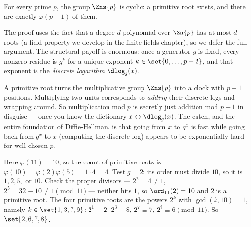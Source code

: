 \begin{theorem}
\label{ch04:thm-primroot-prime}
For every prime $p$, the group $\Zns{p}$ is cyclic: a primitive root exists, and there are exactly
$\varphi(p-1)$ of them.
\end{theorem}

The proof uses the fact that a degree-$d$ polynomial over $\Zn{p}$ has at most $d$ roots (a field
property we develop in the finite-fields chapter), so we defer the full argument. The structural
payoff is enormous: once a generator $g$ is fixed, every nonzero residue is $g^k$ for a unique
exponent $k \in \set{0, \dots, p-2}$, and that exponent is the \emph{discrete logarithm}
$\dlog_g(x)$.

\begin{intuitionbox}
A primitive root turns the multiplicative group $\Zns{p}$ into a clock with $p-1$ positions.
Multiplying two units corresponds to \emph{adding} their discrete logs and wrapping around. So
multiplication mod $p$ is secretly just addition mod $p-1$ in disguise --- once you know the
dictionary $x \leftrightarrow \dlog_g(x)$. The catch, and the entire foundation of Diffie-Hellman,
is that going from $x$ to $g^x$ is fast while going back from $g^x$ to $x$ (computing the discrete
log) appears to be exponentially hard for well-chosen $p$.
\end{intuitionbox}

\begin{center}
\end{center}

\begin{example}
\label{ch04:ex-primroot-11}
Here $\varphi(11) = 10$, so the count of primitive roots is $\varphi(10) = \varphi(2)\varphi(5)
= 1 \cdot 4 = 4$. Test $g = 2$: its order must divide $10$, so it is $1, 2, 5,$ or $10$. Check the
proper divisors --- $2^2 = 4 \neq 1$, $2^5 = 32 \equiv 10 \neq 1 \pmod{11}$ --- neither hits $1$,
so $\ord_{11}(2) = 10$ and $2$ is a primitive root. The four primitive roots are the powers $2^k$
with $\gcd(k, 10) = 1$, namely $k \in \set{1, 3, 7, 9}$: $2^1 = 2$, $2^3 = 8$, $2^7 \equiv 7$,
$2^9 \equiv 6 \pmod{11}$. So $\set{2, 6, 7, 8}$.
\end{example}

